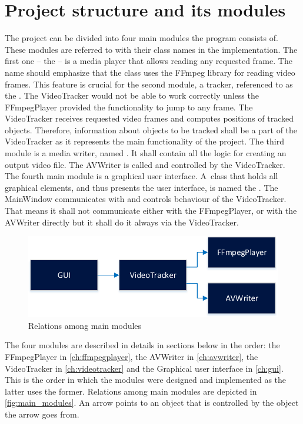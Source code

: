 \section{Project structure and its modules}
The project can be divided into four main modules the program consists of. These modules are referred to with their class names in the implementation. The first one – the  – is a media player that allows reading any requested frame. The name should emphasize that the class uses the FFmpeg library for reading video frames. This feature is crucial for the second module, a tracker, referenced to as the . The VideoTracker would not be able to work correctly unless the FFmpegPlayer provided the functionality to jump to any frame. The VideoTracker receives requested video frames and computes positions of tracked objects. Therefore, information about objects to be tracked shall be a part of the VideoTracker as it represents the main functionality of the project. The third module is a media writer, named . It shall contain all the logic for creating an output video file. The AVWriter is called and controlled by the VideoTracker. The fourth main module is a graphical user interface. A~class that holds all graphical elements, and thus presents the user interface, is named the . The MainWindow communicates with and controls behaviour of the VideoTracker. That means it shall not communicate either with the FFmpegPlayer, or with the AVWriter directly but it shall do it always via the VideoTracker.
\begin{figure}[!htbp]
\centering
\includegraphics{fig/main_modules}
\caption{Relations among main modules}
\label{fig:main_modules}
\end{figure}
The four modules are described in details in sections below in the order: the FFmpegPlayer in \autoref{ch:ffmpegplayer}, the AVWriter in \autoref{ch:avwriter}, the VideoTracker in \autoref{ch:videotracker} and the Graphical user interface in \autoref{ch:gui}. This is the order in which the modules were designed and implemented as the latter uses the former. Relations among main modules are depicted in \autoref{fig:main_modules}. An arrow points to an object that is controlled by the object the arrow goes from.

